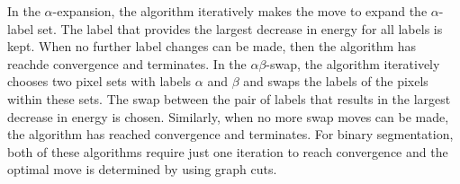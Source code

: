 In the $\alpha$-expansion, the algorithm iteratively makes the move to expand the $\alpha$-label set. The label that provides the largest decrease in energy for all labels is kept. When no further label changes can be made, then  the algorithm has reachde convergence and terminates.
In the $\alpha\beta$-swap, the algorithm iteratively chooses two pixel sets with labels $\alpha$ and $\beta$ and swaps the labels of the pixels within these sets. The swap between the pair of labels that results in the largest decrease in energy is chosen. Similarly, when no more swap moves can be made, the algorithm has reached convergence and terminates. For binary segmentation, both of these algorithms require just one iteration to reach convergence and the optimal move is determined by using graph cuts.

